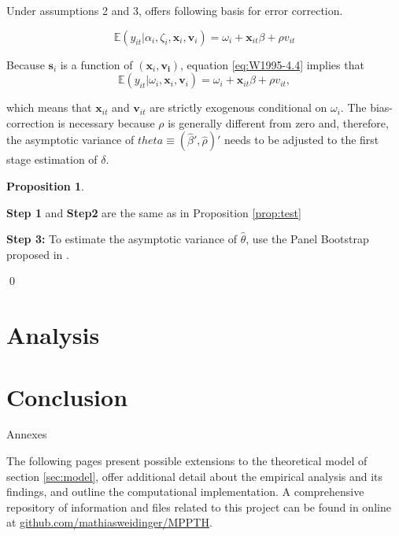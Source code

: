 \documentclass[a4paper,12pt]{article}
\theoremstyle{plain}
\theoremstyle{definition}
\theoremstyle{definition}
\theoremstyle{definition}
\newtheorem{proposition}[theorem]{Proposition}
\theoremstyle{definition}
\begin{document}
Under assumptions 2 and 3, \citet{wooldridge2010} offers following basis for error correction. 

\begin{equation}
    \label{eq:W1995-4.4}
    \mathbb{E}(y_{it}|\alpha_i, \zeta_i, \mathbf{x}_i, \mathbf{v}_i)= \omega_i+\mathbf{x}_{it}\beta+\rho v_{it}
\end{equation}

Because $\mathbf{s}_i$ is a function of $(\mathbf{x}_i, \mathbf{v_i})$, equation \ref{eq:W1995-4.4} implies that
\begin{equation}
    \mathbb{E}(y_{it}|\omega_i, \mathbf{x}_i, \mathbf{v}_i)= \omega_i+\mathbf{x}_{it}\beta+\rho v_{it},
\end{equation}

which means that $\mathbf{x}_{it}$ and $\mathbf{v}_{it}$ are strictly exogenous conditional on $\omega_i$. The bias-correction is necessary because $\rho$ is generally different from zero and, therefore, the asymptotic variance of $\hat{theta}\equiv(\hat{\beta}',\hat{\rho})'$ needs to be adjusted to the first stage estimation of $\delta$.

\begin{proposition}\citep[][Procedure 4.1.1]{wooldridge1995}
\label{prop:correct}

\textbf{Step 1} and \textbf{Step2} are the same as in Proposition \ref{prop:test}

\textbf{Step 3:} To estimate the asymptotic variance of $\hat{\theta}$, use the Panel Bootstrap proposed in \citep{semykina2010}.

\qed
\end{proposition}

\section{Analysis}
\label{sec:findings}

\section{Conclusion}
\label{sec:conclusion}



\newpage
\small



\newpage
\appendix
\huge{Annexes\\}\vspace{10pt}
\normalsize

The following pages present possible extensions to the theoretical model of section \ref{sec:model}, offer additional detail about the empirical analysis and its findings, and outline the computational implementation. A comprehensive repository of information and files related to this project can be found in online at \href{https://github.com/mathiasweidinger/MPPTH}{github.com/mathiasweidinger/MPPTH}.
\end{document}
